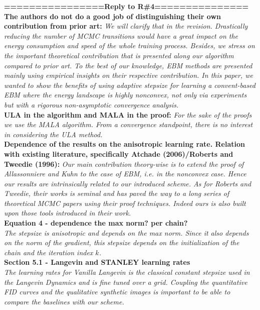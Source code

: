 \documentclass{article}
\begin{document}
\textbf{================Reply to R\#4===============}\\
\textbf{The authors do not do a good job of distinguishing their own contribution from prior art:}
\textit{We will clarify that in the revision.
Drastically reducing the number of MCMC transitions would have a great impact on the energy consumption and speed of the whole training process. Besides, we stress on the important theoretical contribution that is presented along our algorithm compared to prior art. 
To the best of our knowledge, EBM methods are presented mainly using empirical insights on their respective contribution. In this paper, we wanted to show the benefits of using adaptive stepsize for learning a convent-based EBM where the energy landscape is highly nonconvex, not only via experiments but with a rigorous non-asymptotic convergence analysis.} \\
\textbf{ULA in the algorithm and MALA in the proof:}
\textit{ For the sake of the proofs we use the MALA algorithm. From a convergence standpoint, there is no interest in considering the ULA method.}\\
\textbf{Dependence of the results on the anisotropic learning rate. Relation with existing literature, specifically Atchade (2006)/Roberts and Tweedie (1996):}
\textit{Our main contribution theory-wise is to extend the proof of Allassonniere and Kuhn to the case of EBM, i.e. in the nonconvex case. Hence our results are intrinsically related to our introduced scheme. As for Roberts and Tweedie, their works is seminal and has paved the way to a long series of theoretical MCMC papers using their proof techniques. Indeed ours is also built upon those tools introduced in their work.}\\
\textbf{Equation 4 - dependence the max norm? per chain?}\\
\textit{The stepsize is anisotropic and depends on the max norm. Since it also depends on the norm of the gradient, this stepsize depends on the initialization of the chain and the iteration index $k$.}\\
\textbf{Section 5.1 - Langevin and STANLEY learning rates}\\
\textit{The learning rates for Vanilla Langevin is the classical constant stepsize used in the Langevin Dynamics and is fine tuned over a grid. 
Coupling the quantitative FID curves and the qualitative synthetic images is important to be able to compare the baselines with our scheme.}\\
\end{document}
